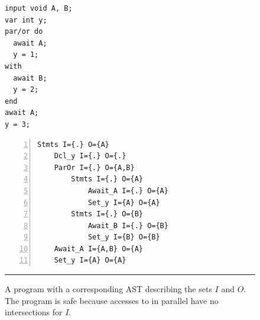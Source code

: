 \begin{figure}[h]
\begin{minipage}[t]{0.45\linewidth}
\begin{lstlisting}
input void A, B;
var int y;
par/or do
  await A;
  y = 1;
with
  await B;
  y = 2;
end
await A;
y = 3;
\end{lstlisting}
\end{minipage}
%
%
\begin{minipage}[t]{0.55\linewidth}
\begin{lstlisting}[numbers=left,xleftmargin=2.5em]
Stmts I={.} O={A}
    Dcl_y I={.} O={.}
    ParOr I={.} O={A,B}
        Stmts I={.} O={A}
            Await_A I={.} O={A}
            Set_y I={A} O={A}
        Stmts I={.} O={B}
            Await_B I={.} O={B}
            Set_y I={B} O={B}
    Await_A I={A,B} O={A}
    Set_y I={A} O={A}
\end{lstlisting}
\end{minipage}
%
\rule{14cm}{0.37pt}
\caption{ A program with a corresponding AST describing the sets $I$ and $O$.
The program is safe because accesses to  in parallel have no 
intersections for $I$.
\label{lst.impl.ast}
}
\end{figure}


